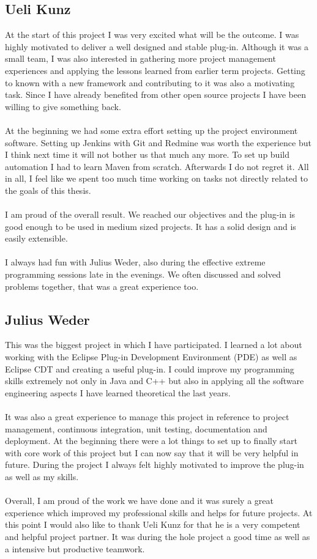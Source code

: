 \documentclass[11pt,a4paper,oneside]{scrreprt}
\begin{document}
\subsection{Ueli Kunz}
At the start of this project I was very excited what will be the outcome. I was highly motivated to deliver a well designed and stable plug-in. Although it was a small team, I was also interested in gathering more project management experiences and applying the lessons learned from earlier term projects. Getting to known with a new framework and contributing to it was also a motivating task. Since I have already benefited from other open source projects I have been willing to give something back.
\\\\
At the beginning we had some extra effort setting up the project environment software. Setting up Jenkins with Git and Redmine was worth the experience but I think next time it will not bother us that much any more. To set up build automation I had to learn Maven from scratch. Afterwards I do not regret it. All in all, I feel like we spent too much time working on tasks not directly related to the goals of this thesis.
\\\\
I am proud of the overall result. We reached our objectives and the plug-in is good enough to be used in medium sized projects. It has a solid design and is easily extensible.
\\\\
I always had fun with Julius Weder, also during the effective extreme programming sessions late in the evenings. We often discussed and solved problems together, that was a great experience too.

\subsection{Julius Weder}
This was the biggest project in which I have participated. I learned a lot about working with the Eclipse Plug-in Development Environment (PDE) as well as Eclipse CDT and creating a useful plug-in. I could improve my programming skills extremely not only in Java and C++ but also in applying all the software engineering aspects I have learned theoretical the last years.\\\\ 
It was also a great experience to manage this project in reference to project management, continuous integration, unit testing, documentation and deployment. At the beginning there were a lot things to set up to finally start with core work of this project but I can now say that it will be very helpful in future. During the project I always felt highly motivated to improve the plug-in as well as my skills.
\\\\Overall, I am proud of the work we have done and it was surely a great experience which improved my professional skills and helps for future projects.
At this point I would also like to thank Ueli Kunz for that he is a very competent and helpful project partner. It was during the hole project a good time as well as a intensive but productive teamwork.
\end{document}
